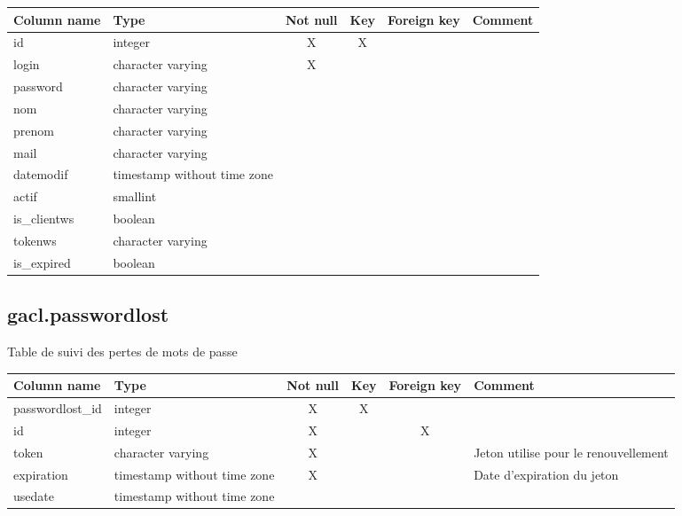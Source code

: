 \begin{tabular}{|l| p{2cm}|c|c|c| p{3cm}|}
\hline
Column name & Type & Not null & Key & Foreign key & Comment \\
\hline
id & integer & X & X & & \\
\hline
login & character varying & X & & & \\
\hline
password & character varying & & & & \\
\hline
nom & character varying & & & & \\
\hline
prenom & character varying & & & & \\
\hline
mail & character varying & & & & \\
\hline
datemodif & timestamp without time zone & & & & \\
\hline
actif & smallint & & & & \\
\hline
is\_clientws & boolean & & & & \\
\hline
tokenws & character varying & & & & \\
\hline
is\_expired & boolean & & & & \\
\hline
\end{tabular}
\subsection{gacl.passwordlost}
Table de suivi des pertes de mots de passe

\begin{tabular}{|l| p{2cm}|c|c|c| p{3cm}|}
\hline
Column name & Type & Not null & Key & Foreign key & Comment \\
\hline
passwordlost\_id & integer & X & X & & \\
\hline
id & integer & X & & X & \\
\hline
token & character varying & X & & & Jeton utilise pour le renouvellement\\
\hline
expiration & timestamp without time zone & X & & & Date d'expiration du jeton\\
\hline
usedate & timestamp without time zone & & & & \\
\hline
\end{tabular}